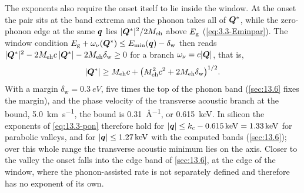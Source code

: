 The exponents also require the onset itself to lie inside the window. At the onset the pair sits at the band extrema and the phonon takes all of $\bm{Q}^*$, while the zero-phonon edge at the same $\bm{q}$ lies $|\bm{Q}^*|^2/2M_{\mathrm{eh}}$ above $E_{\mathrm{g}}$ (\cref{eq:3.3-Eminpar}). The window condition $E_{\mathrm{g}} + \omega_\nu(\bm{Q}^*) \le E_{\mathrm{min}}(\bm{q}) - \delta_{\mathrm{w}}$ then reads $|\bm{Q}^*|^2 - 2M_{\mathrm{eh}}c\,|\bm{Q}^*| - 2M_{\mathrm{eh}}\delta_{\mathrm{w}} \ge 0$ for a branch $\omega_\nu = c|\bm{Q}|$, that is,
\begin{equation*}
  |\bm{Q}^*| \ge M_{\mathrm{eh}}c + \bigl(M_{\mathrm{eh}}^2c^2 + 2M_{\mathrm{eh}}\delta_{\mathrm{w}}\bigr)^{1/2} .
\end{equation*}
With a margin $\delta_{\mathrm{w}} = \SI{0.3}{eV}$, five times the top of the phonon band (\cref{sec:13.6} fixes the margin), and the phase velocity of the transverse acoustic branch at the bound, \SI{5.0}{km.s^{-1}}, the bound is \SI{0.31}{\angstrom^{-1}}, or \SI{0.615}{keV}. In silicon the exponents of \cref{eq:13.3-pon} therefore hold for $|\bm{q}| \le k_{\mathrm{c}} - \SI{0.615}{keV} = \SI{1.33}{keV}$ for parabolic valleys, and for $|\bm{q}| \le \SI{1.27}{keV}$ with the computed bands (\cref{sec:13.6}); over this whole range the transverse acoustic minimum lies on the axis. Closer to the valley the onset falls into the edge band of \cref{sec:13.6}, at the edge of the window, where the phonon-assisted rate is not separately defined and therefore has no exponent of its own.

